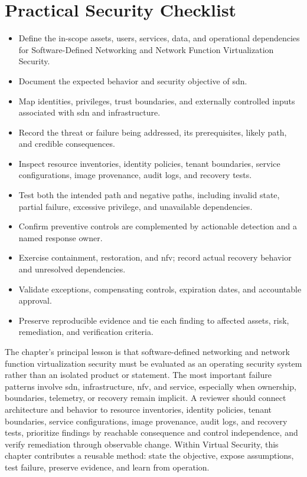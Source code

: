 \documentclass[11pt]{article}
\begin{document}
\section*{Practical Security Checklist}
\begin{itemize}[label=$\square$]
\item Define the in-scope assets, users, services, data, and operational dependencies for Software-Defined Networking and Network Function Virtualization Security.
\item Document the expected behavior and security objective of sdn.
\item Map identities, privileges, trust boundaries, and externally controlled inputs associated with sdn and infrastructure.
\item Record the threat or failure being addressed, its prerequisites, likely path, and credible consequences.
\item Inspect resource inventories, identity policies, tenant boundaries, service configurations, image provenance, audit logs, and recovery tests.
\item Test both the intended path and negative paths, including invalid state, partial failure, excessive privilege, and unavailable dependencies.
\item Confirm preventive controls are complemented by actionable detection and a named response owner.
\item Exercise containment, restoration, and nfv; record actual recovery behavior and unresolved dependencies.
\item Validate exceptions, compensating controls, expiration dates, and accountable approval.
\item Preserve reproducible evidence and tie each finding to affected assets, risk, remediation, and verification criteria.
\end{itemize}
\begin{synthesisbox}
The chapter's principal lesson is that software-defined networking and network function virtualization security must be evaluated as an operating security system rather than an isolated product or statement. The most important failure patterns involve sdn, infrastructure, nfv, and service, especially when ownership, boundaries, telemetry, or recovery remain implicit. A reviewer should connect architecture and behavior to resource inventories, identity policies, tenant boundaries, service configurations, image provenance, audit logs, and recovery tests, prioritize findings by reachable consequence and control independence, and verify remediation through observable change. Within Virtual Security, this chapter contributes a reusable method: state the objective, expose assumptions, test failure, preserve evidence, and learn from operation.
\end{synthesisbox}
\end{document}
